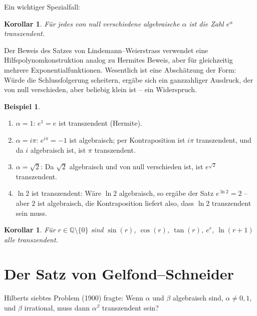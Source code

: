 \documentclass[12pt,a4paper]{amsart}
\newtheorem{korollar}[theorem]{Korollar}
\theoremstyle{definition}
\newtheorem{beispiel}[theorem]{Beispiel}
\begin{document}
Ein wichtiger Spezialfall:

\begin{korollar}
Für jedes von null verschiedene algebraische $\alpha$ ist die Zahl $e^\alpha$
transzendent.
\end{korollar}

Der Beweis des Satzes von Lindemann--Weierstrass verwendet eine
Hilfspolynomkonstruktion analog zu Hermites Beweis, aber für gleichzeitig
mehrere Exponentialfunktionen. Wesentlich ist eine Abschätzung der Form:
Würde die Schlussfolgerung scheitern, ergäbe sich ein ganzzahliger Ausdruck,
der von null verschieden, aber beliebig klein ist -- ein Widerspruch.

\begin{beispiel}
\begin{enumerate}[label=(\roman*)]
  \item $\alpha = 1$: $e^1 = e$ ist transzendent (Hermite).
  \item $\alpha = i\pi$: $e^{i\pi} = -1$ ist algebraisch; per Kontraposition
        ist $i\pi$ transzendent, und da $i$ algebraisch ist, ist $\pi$
        transzendent.
  \item $\alpha = \sqrt{2}$: Da $\sqrt{2}$ algebraisch und von null verschieden
        ist, ist $e^{\sqrt{2}}$ transzendent.
  \item $\ln 2$ ist transzendent: Wäre $\ln 2$ algebraisch, so ergäbe der Satz
        $e^{\ln 2} = 2$ -- aber $2$ ist algebraisch, die Kontraposition liefert
        also, dass $\ln 2$ transzendent sein muss.
\end{enumerate}
\end{beispiel}

\begin{korollar}
Für $r \in \mathbb{Q} \setminus \{0\}$ sind $\sin(r)$, $\cos(r)$, $\tan(r)$,
$e^r$, $\ln(r+1)$ alle transzendent.
\end{korollar}


\section{Der Satz von Gelfond--Schneider}
\label{sec:gelfond-schneider}

Hilberts siebtes Problem (1900) fragte: Wenn $\alpha$ und $\beta$ algebraisch
sind, $\alpha \neq 0, 1$, und $\beta$ irrational, muss dann $\alpha^\beta$
transzendent sein?
\end{document}
